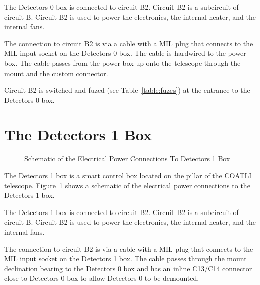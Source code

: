 The Detectors 0 box is connected to circuit B2. Circuit B2 is a subcircuit of circuit B. Circuit B2 is used to power the electronics, the internal heater, and the internal fans.

The connection to circuit B2 is via a cable with a MIL plug that connects to the MIL input socket on the Detectors 0 box. The cable is hardwired to the power box. The cable passes from the power box up onto the telescope through the mount and the custom connector.

Circuit B2 is switched and fuzed (see Table~\ref{table:fuzes}) at the entrance to the Detectors 0 box.

\section{The Detectors 1 Box}

\begin{figure}
\begin{center}
\footnotesize 
{}
\end{center}
\caption{Schematic of the Electrical Power Connections To Detectors 1 Box}
\label{figure:schematic-electrical-power-detectors1-box}
\end{figure}

The Detectors 1 box is a smart control box located on the pillar of the COATLI telescope. Figure~\ref{figure:schematic-electrical-power-detectors1-box} shows a schematic of the electrical power connections to the Detectors 1 box.

The Detectors 1 box is connected to circuit B2. Circuit B2 is a subcircuit of circuit B. Circuit B2 is used to power the electronics, the internal heater, and the internal fans.

The connection to circuit B2 is via a cable with a MIL plug that connects to the MIL input socket on the Detectors 1 box. The cable passes through the mount declination bearing to the Detectors 0 box and has an inline C13/C14 connector close to Detectors 0 box to allow Detectors 0 to be demounted.

